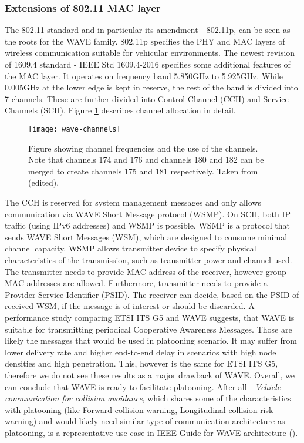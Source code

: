 \subsubsection*{Extensions of 802.11 MAC layer} 
The 802.11 standard and in particular its amendment - 802.11p, can be seen as the roots for the WAVE family. 802.11p specifies the PHY and MAC layers of wireless communication suitable for vehicular environments. The newest revision of 1609.4 standard - IEEE Std 1609.4-2016 specifies some additional features of the MAC layer. It operates on frequency band 5.850GHz to 5.925GHz. While 0.005GHz at the lower edge is kept in reserve, the rest of the band is divided into 7 channels. These are further divided into Control Channel (CCH) and Service Channels (SCH). Figure \ref{fig:wave-channels} describes channel allocation in detail.\par
% 
\begin{figure}[ht]
    \centering
    \texttt{[image: wave-channels]}
    \caption{Figure showing channel frequencies and the use of the channels. Note that channels 174 and 176 and channels 180 and 182 can be merged to create channels 175 and 181 respectively. Taken from \cite[p. 20]{VehicularTechnologySociety2014IEEEArchitecture} (edited).}
    \label{fig:wave-channels}
\end{figure}
% 
The CCH is reserved for system management messages and only allows communication via WAVE Short Message protocol (WSMP). On SCH, both IP traffic (using IPv6 addresses) and WSMP is possible. WSMP is a protocol that sends WAVE Short Messages (WSM), which are designed to consume minimal channel capacity. WSMP allows transmitter device to specify physical characteristics of the transmission, such as transmitter power and channel used. The transmitter needs to provide MAC address of the receiver, however group MAC addresses are allowed. Furthermore, transmitter needs to provide a Provider Service Identifier (PSID)\footnotemark. The receiver can decide, based on the PSID of received WSM, if the message is of interest or should be discarded.
% 
% 
A performance study comparing ETSI ITS G5 and WAVE\cite{Eckhoff2013AWAVE} suggests, that WAVE is suitable for transmitting periodical Cooperative Awareness Messages. Those are likely the messages that would be used in platooning scenario. It may suffer from lower delivery rate and higher end-to-end delay in scenarios with high node densities and high penetration. This, however is the same for ETSI ITS G5, therefore we do not see these results as a major drawback of WAVE. Overall, we can conclude that WAVE is ready to facilitate platooning. After all - \emph{Vehicle communication for collision avoidance}, which shares some of the characteristics with platooning (like Forward collision warning, Longitudinal collision risk warning) and would likely need similar type of communication architecture as platooning, is a representative use case in IEEE Guide for WAVE architecture (\cite{VehicularTechnologySociety2014IEEEArchitecture}).